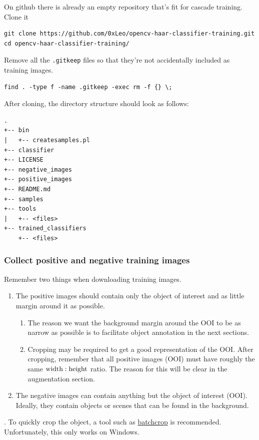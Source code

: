 \documentclass[a4paper]{article}
\begin{document}
On github there is already an empty repository that's fit for cascade training. Clone it
\begin{lstlisting}[style=terminal]
git clone https://github.com/0xLeo/opencv-haar-classifier-training.git
cd opencv-haar-classifier-training/
\end{lstlisting}
Remove all the \texttt{.gitkeep} files so that they're not accidentally included as training images.
\begin{lstlisting}[style=terminal]
find . -type f -name .gitkeep -exec rm -f {} \;
\end{lstlisting}
After cloning, the directory structure should look as follows:
\begin{verbatim}
.
+-- bin
|   +-- createsamples.pl
+-- classifier
+-- LICENSE
+-- negative_images
+-- positive_images
+-- README.md
+-- samples
+-- tools
|   +-- <files>
+-- trained_classifiers
    +-- <files>
\end{verbatim}



\subsubsection{Collect positive and negative training images}

Remember two things when downloading training images.
\begin{enumerate}
    \item The positive images should contain only the object of interest and as little margin around it as possible.
    \begin{enumerate}
        \item The reason we want the background margin around the OOI to be as narrow as possible is to facilitate object annotation in the next sections.
        \item Cropping may be required to get a good representation of the OOI. After cropping, remember that all positive images (OOI) must have roughly the same $\textup{width}:\textup{height}$ ratio. The reason for this will be clear in the augmentation section.
    \end{enumerate}
    \item The negative images can contain anything but the object of interest (OOI). Ideally, they contain objects or scenes that can be found in the background.
\end{enumerate}
. To quickly crop the object, a tool such as  \href{https://www.batchcrop.com}{batchcrop} is recommended. Unfortunately, this only works on Windows. 
\end{document}
